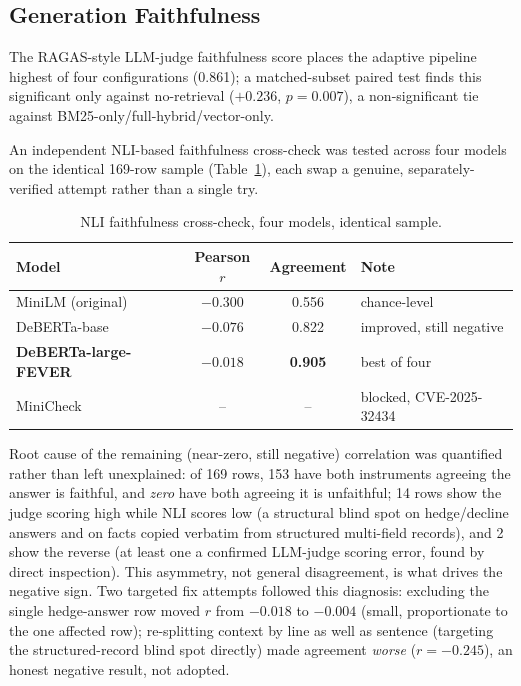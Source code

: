 \documentclass[a4paper,twoside]{article}
\begin{document}
\subsection{Generation Faithfulness}
\label{subsec:results-faithfulness}

The RAGAS-style LLM-judge faithfulness score places the adaptive pipeline highest of four configurations (0.861); a matched-subset paired test finds this significant only against no-retrieval ($+0.236$, $p=0.007$), a non-significant tie against BM25-only/full-hybrid/vector-only.

An independent NLI-based faithfulness cross-check was tested across four models on the identical 169-row sample (Table~\ref{tab:nli-report}), each swap a genuine, separately-verified attempt rather than a single try.

\begin{table}[h]
\caption{NLI faithfulness cross-check, four models, identical sample.}\label{tab:nli-report}\centering
\begin{tabular}{|l|c|c|l|}
\hline
Model & Pearson $r$ & Agreement & Note \\
\hline
MiniLM (original) & $-0.300$ & 0.556 & chance-level \\
DeBERTa-base & $-0.076$ & 0.822 & improved, still negative \\
\textbf{DeBERTa-large-FEVER} & \textbf{$-0.018$} & \textbf{0.905} & best of four \\
MiniCheck & -- & -- & blocked, CVE-2025-32434 \\
\hline
\end{tabular}
\end{table}

Root cause of the remaining (near-zero, still negative) correlation was quantified rather than left unexplained: of 169 rows, 153 have both instruments agreeing the answer is faithful, and \emph{zero} have both agreeing it is unfaithful; 14 rows show the judge scoring high while NLI scores low (a structural blind spot on hedge/decline answers and on facts copied verbatim from structured multi-field records), and 2 show the reverse (at least one a confirmed LLM-judge scoring error, found by direct inspection). This asymmetry, not general disagreement, is what drives the negative sign. Two targeted fix attempts followed this diagnosis: excluding the single hedge-answer row moved $r$ from $-0.018$ to $-0.004$ (small, proportionate to the one affected row); re-splitting context by line as well as sentence (targeting the structured-record blind spot directly) made agreement \emph{worse} ($r=-0.245$), an honest negative result, not adopted.
\end{document}
